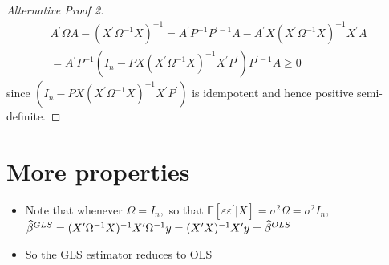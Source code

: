 \documentclass[notes=show]{beamer}
\begin{document}
\begin{frame}%

\begin{proof}[Alternative Proof 2]
\begin{gather*}
A^{\prime }\Omega A-(X^{\prime }\Omega ^{-1}X)^{-1}=A^{\prime
}P^{-1}P^{\prime -1}A-A^{\prime }X(X^{\prime }\Omega ^{-1}X)^{-1}X^{\prime }A
\\
=A^{\prime }P^{-1}\left( I_{n}-PX(X^{\prime }\Omega ^{-1}X)^{-1}X^{\prime
}P^{\prime }\right) P^{\prime -1}A\geq 0
\end{gather*}%
since $(I_{n}-PX\left( X^{\prime }\Omega ^{-1}X\right) ^{-1}X^{\prime
}P^{\prime })$ is idempotent and hence positive semi-definite.
\end{proof}

\end{frame}%

\section{More properties}

\begin{frame}%


\begin{itemize}
\item Note that whenever $\Omega =I_{n},$ so that $\mathbb{E}[\varepsilon
\varepsilon ^{\prime }|X]=\sigma ^{2}\Omega =\sigma ^{2}I_{n},$ $\widehat{%
\beta }^{GLS}=(X^{\prime }\Omega ^{-1}X)^{-1}X^{\prime }\Omega
^{-1}y=(X^{\prime }X)^{-1}X^{\prime }y=\widehat{\beta }^{OLS}$

\item So the GLS estimator reduces to OLS
\end{itemize}

\end{frame}%
\end{document}
